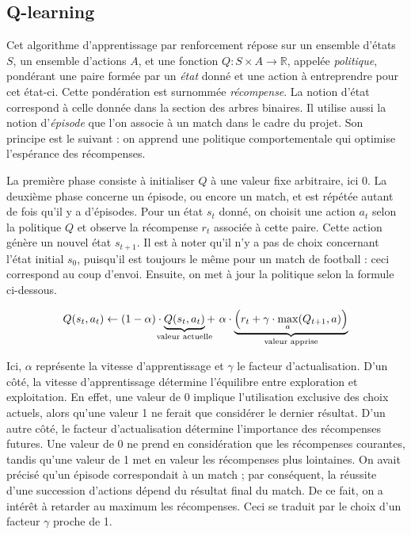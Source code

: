 \documentclass[12pt,a4paper]{article}
\begin{document}
\subsection*{Q-learning}
Cet algorithme d'apprentissage par renforcement r\'epose sur un ensemble 
d'\'etats $S$, un ensemble d'actions $A$, et une fonction $Q: S \times A \to 
\mathbb{R}$, appel\'ee {\itshape politique}, pond\'erant une paire form\'ee 
par un {\itshape \'etat} donn\'e et une action \`a entreprendre pour cet 
\'etat-ci. Cette pond\'eration est surnomm\'ee {\itshape r\'ecompense}. La 
notion d'\'etat correspond \`a celle donn\'ee dans la section des arbres 
binaires. Il utilise aussi la notion d'{\itshape \'episode} que l'on associe 
\`a un match dans le cadre du projet. Son principe est le suivant : on apprend 
une politique comportementale qui optimise l'esp\'erance des r\'ecompenses.

La premi\`ere phase consiste \`a initialiser $Q$ \`a une valeur fixe 
arbitraire, ici 0. La deuxi\`eme phase concerne un \'episode, ou encore un 
match, et est r\'ep\'et\'ee autant de fois qu'il y a d'\'episodes. Pour un 
\'etat $s_t$ donn\'e, on choisit une action $a_t$ selon la politique $Q$ et 
observe la r\'ecompense $r_t$ associ\'ee \`a cette paire. Cette action 
g\'en\`ere un nouvel \'etat $s_{t+1}$. Il est \`a noter qu'il n'y a pas de 
choix concernant l'\'etat initial $s_0$, puisqu'il est toujours le m\^eme pour 
un match de football : ceci correspond au coup d'envoi. Ensuite, on met \`a 
jour la politique selon la formule ci-dessous.

\begin{equation*}
  Q(s_t,a_t) \gets (1-\alpha) \cdot 
  \underbrace{Q(s_t,a_t)}_{\mathclap{\text{valeur actuelle}}} + \ \alpha \cdot 
\underbrace{\Big(r_t + \gamma \cdot \max_a(Q_{t+1},a) 
  \Big)}_{\mathclap{\text{valeur   apprise}}}
\end{equation*}

Ici, $\alpha$ repr\'esente la vitesse d'apprentissage et $\gamma$ le facteur 
d'actualisation. D'un c\^ot\'e, la vitesse d'apprentissage d\'etermine 
l'\'equilibre entre exploration et exploitation. En effet, une valeur de 
0 implique l'utilisation exclusive des choix actuels, alors qu'une 
valeur 1 ne ferait que consid\'erer le dernier r\'esultat.
D'un autre c\^ot\'e, le facteur d'actualisation d\'etermine l'importance des 
r\'ecompenses futures. Une valeur de 0 ne prend en consid\'eration que les 
r\'ecompenses courantes, tandis qu'une valeur de 1 met en valeur les 
r\'ecompenses plus lointaines. On avait pr\'ecis\'e qu'un \'episode 
correspondait \`a un match ; par cons\'equent, la r\'eussite d'une succession 
d'actions d\'epend du r\'esultat final du match. De ce fait, on a int\'er\^et 
\`a retarder au maximum les r\'ecompenses. Ceci se traduit par le choix d'un 
facteur $\gamma$ proche de 1.
\end{document}
